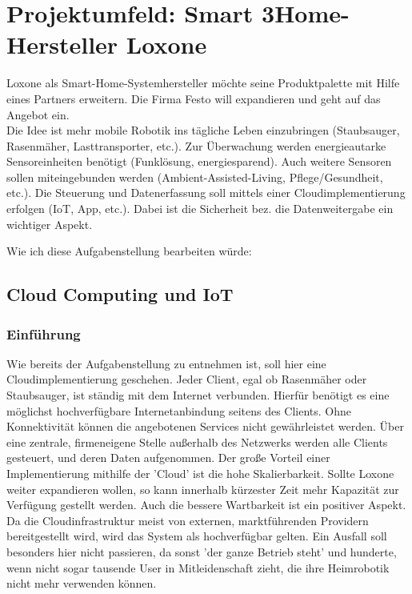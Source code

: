 \documentclass[letterpaper, 12pt]{article}
\let\tempsection\section
\renewcommand\section[1]{\vspace{-0.3cm}\tempsection{#1}\vspace{-0.3cm}}
\let\tempsubsection\subsection
\renewcommand\subsection[1]{\vspace{0cm}\tempsubsection{#1}\vspace{0cm}}
\let\tempsubsubsection\subsubsection
\renewcommand\subsubsection[1]{\vspace{0cm}\tempsubsubsection{#1}\vspace{0cm}}
\begin{document}
\clearpage

\section{Projektumfeld: Smart 3Home-Hersteller Loxone}

Loxone als Smart-Home-Systemhersteller möchte seine Produktpalette mit
Hilfe eines Partners erweitern. Die Firma Festo will expandieren und
geht auf das Angebot ein. \\
Die Idee ist mehr mobile Robotik ins tägliche Leben einzubringen
(Staubsauger, Rasenmäher, Lasttransporter, etc.). Zur Überwachung werden
energieautarke Sensoreinheiten benötigt (Funklösung, energiesparend).
Auch weitere Sensoren sollen miteingebunden werden
(Ambient-Assisted-Living, Pflege/Gesundheit, etc.).
Die Steuerung und Datenerfassung soll mittels einer Cloudimplementierung
erfolgen (IoT, App, etc.).
Dabei ist die Sicherheit bez. die Datenweitergabe ein wichtiger Aspekt.

Wie ich diese Aufgabenstellung bearbeiten würde:

\subsection{Cloud Computing und IoT}

\subsubsection{Einführung}

Wie bereits der Aufgabenstellung zu entnehmen ist, soll hier eine Cloudimplementierung geschehen. Jeder Client, egal ob Rasenmäher oder Staubsauger, ist ständig mit dem Internet verbunden. Hierfür benötigt es eine möglichst hochverfügbare Internetanbindung seitens des Clients. Ohne Konnektivität können die angebotenen Services nicht gewährleistet werden. Über eine zentrale, firmeneigene Stelle außerhalb des Netzwerks werden alle Clients gesteuert, und deren Daten aufgenommen. Der große Vorteil einer Implementierung mithilfe der 'Cloud' ist die hohe Skalierbarkeit. Sollte Loxone weiter expandieren wollen, so kann innerhalb kürzester Zeit mehr Kapazität zur Verfügung gestellt werden. Auch die bessere Wartbarkeit ist ein positiver Aspekt. Da die Cloudinfrastruktur meist von externen, marktführenden Providern bereitgestellt wird, wird das System als hochverfügbar gelten. Ein Ausfall soll besonders hier nicht passieren, da sonst 'der ganze Betrieb steht' und hunderte, wenn nicht sogar tausende User in Mitleidenschaft zieht, die ihre Heimrobotik nicht mehr verwenden können.
\end{document}
